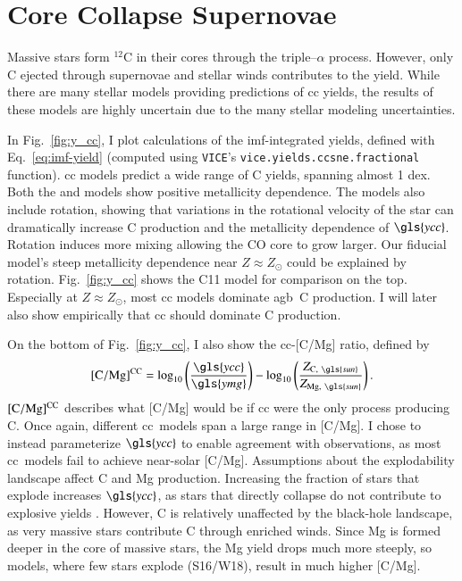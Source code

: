 \documentclass[12pt,oneside,letterpaper]{report}
\newcommand{\cc}{\gls{cc}}
\newcommand{\agb}{\gls{agb}}
\newcommand{\imf}{\gls{imf}}
\newcommand{\Ycc}{\gls{ycc}}
\newcommand{\Yoc}{\gls{ymg}}
\newcommand{\sun}{\gls{sun}}
\newcommand{\VICE}{\texttt{VICE}}
\begin{document}
\section{Core Collapse Supernovae}


Massive stars form $^{12}$C in their cores through the triple--$\alpha$ process. However, only C ejected through supernovae and stellar winds contributes to the yield. 
While there are many stellar models providing predictions of \cc{} yields, the results of these models are highly uncertain due to the many stellar modeling uncertainties. 

In Fig.~\ref{fig:y_cc}, I plot calculations of the \imf-integrated yields, defined with Eq.~\ref{eq:imf-yield} (computed using \VICE's \texttt{vice.yields.ccsne.fractional} function). 
\cc{} models predict a wide range of C yields, spanning almost 1 dex. 
Both the \citet{NKT13} and \cite{LC18} models show positive metallicity dependence. 
The \cite{LC18} models also include rotation, showing that variations in the rotational velocity of the star can dramatically increase C production and the metallicity dependence of $\Ycc$. Rotation induces more mixing allowing the CO core to grow larger. Our fiducial model's steep metallicity dependence near $Z\approx Z_\odot$ could be explained by rotation. 
Fig.~\ref{fig:y_cc} shows the C11 model for comparison on the top. Especially at $Z\approx Z_\odot$, most \cc{} models dominate \agb\ C production. I will later also show empirically that \cc{} should dominate C production. 

On the bottom of Fig.~\ref{fig:y_cc}, I also show the \cc{}-[C/Mg] ratio, defined by
\begin{equation}\label{eq:c_mg_cc}
    {\rm [C/Mg]^{CC}} = \log_{10}\left( \frac{\Ycc}{\Yoc}\right) - \log_{10} \left( \frac{Z_{{\rm C},\ \sun }}{Z_{{\rm Mg},\ \sun }} \right).
\end{equation}
${\rm [C/Mg]^{CC}}$ describes what [C/Mg] would be if \cc{} were the only process producing C.
Once again, different \cc\ models span a large range in [C/Mg]. 
I chose to instead parameterize $\Ycc$ to enable agreement with observations, as most \cc\ models fail to achieve near-solar [C/Mg].
Assumptions about the explodability landscape affect C and Mg production. Increasing the fraction of stars that explode increases $\Ycc$, as stars that directly collapse do not contribute to explosive yields \citep{emily+21}. However, C is relatively unaffected by the black-hole landscape, as very massive stars contribute C through enriched winds. Since Mg is formed deeper in the core of massive stars, the Mg yield drops much more steeply, so models, where few stars explode (S16/W18), result in much higher [C/Mg].
\end{document}
